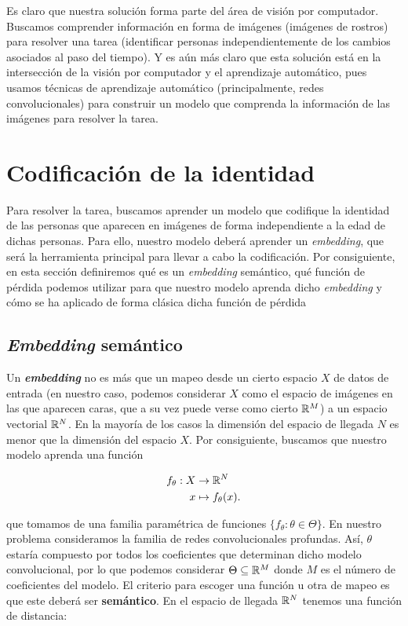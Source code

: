 Es claro que nuestra solución forma parte del área de visión por computador. Buscamos comprender información en forma de imágenes (imágenes de rostros) para resolver una tarea (identificar personas independientemente de los cambios asociados al paso del tiempo). Y es aún más claro que esta solución está en la intersección de la visión por computador y el aprendizaje automático, pues usamos técnicas de aprendizaje automático (principalmente, redes convolucionales) para construir un modelo que comprenda la información de las imágenes para resolver la tarea.

\section{Codificación de la identidad}

Para resolver la tarea, buscamos aprender un modelo que codifique la identidad de las personas que aparecen en imágenes de forma independiente a la edad de dichas personas. Para ello, nuestro modelo deberá aprender un \textit{embedding}, que será la herramienta principal para llevar a cabo la codificación. Por consiguiente, en esta sección definiremos qué es un \textit{embedding} semántico, qué función de pérdida podemos utilizar para que nuestro modelo aprenda dicho \textit{embedding} y cómo se ha aplicado de forma clásica dicha función de pérdida

\subsection{\textit{Embedding} semántico} \label{isec:embeddings}

Un \textbf{\textit{embedding}} no es más que un mapeo desde un cierto espacio $X$ de datos de entrada (en nuestro caso, podemos considerar $X$ como el espacio de imágenes en las que aparecen caras, que a su vez puede verse como cierto $\mathbb{R}^M$) a un espacio vectorial $\mathbb{R}^N$. En la mayoría de los casos la dimensión del espacio de llegada $N$ es menor que la dimensión del espacio $X$. Por consiguiente, buscamos que nuestro modelo aprenda una función

\begin{equation}
	\begin{split}
		f_{\theta}: X & \to \mathbb{R}^N \\
		x & \mapsto f_{\theta}(x).
	\end{split}
\end{equation}

que tomamos de una familia paramétrica de funciones $\{f_{\theta}: \theta \in \Theta \}$. En nuestro problema consideramos la familia de redes convolucionales profundas. Así, $\theta$ estaría compuesto por todos los coeficientes que determinan dicho modelo convolucional, por lo que podemos considerar $\Theta \subseteq \mathbb{R}^M$ donde $M$ es el número de coeficientes del modelo. El criterio para escoger una función u otra de mapeo es que este deberá ser \textbf{semántico}. En el espacio de llegada $\mathbb{R}^N$ tenemos una función de distancia:

